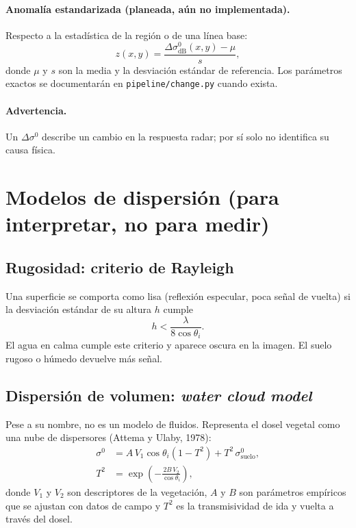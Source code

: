 \documentclass[11pt,a4paper]{article}
\begin{document}
\paragraph{Anomalía estandarizada (planeada, aún no implementada).}
Respecto a la estadística de la región o de una línea base:
\begin{equation}
  z(x,y) = \frac{\Delta\sigma^0_{\text{dB}}(x,y) - \mu}{s},
\end{equation}
donde $\mu$ y $s$ son la media y la desviación estándar de referencia. Los parámetros exactos se
documentarán en \texttt{pipeline/change.py} cuando exista.

\paragraph{Advertencia.} Un $\Delta\sigma^0$ describe un cambio en la respuesta radar; por sí solo
no identifica su causa física.

\section{Modelos de dispersión (para interpretar, no para medir)}

\subsection{Rugosidad: criterio de Rayleigh}
Una superficie se comporta como lisa (reflexión especular, poca señal de vuelta) si la desviación
estándar de su altura $h$ cumple
\begin{equation}
  h < \frac{\lambda}{8\cos\theta_i}.
\end{equation}
El agua en calma cumple este criterio y aparece oscura en la imagen. El suelo rugoso o húmedo
devuelve más señal.

\subsection{Dispersión de volumen: \emph{water cloud model}}
Pese a su nombre, no es un modelo de fluidos. Representa el dosel vegetal como una nube de
dispersores (Attema y Ulaby, 1978):
\begin{align}
  \sigma^0 &= A\, V_1 \cos\theta_i \left(1 - T^2\right) + T^2\, \sigma^0_{\text{suelo}}, \\
  T^2 &= \exp\!\left(-\frac{2 B\, V_2}{\cos\theta_i}\right),
\end{align}
donde $V_1$ y $V_2$ son descriptores de la vegetación, $A$ y $B$ son parámetros empíricos que se
ajustan con datos de campo y $T^2$ es la transmisividad de ida y vuelta a través del dosel.
\end{document}
